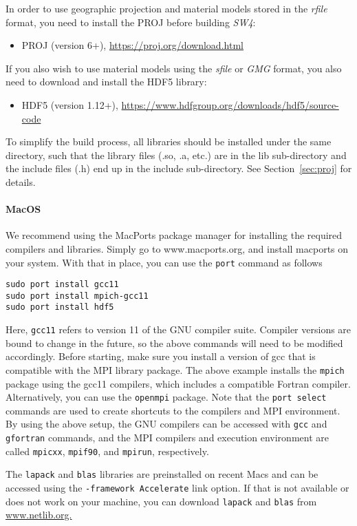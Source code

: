 \documentclass[11pt]{article}
\begin{document}
In order to use geographic projection and material models stored in the \emph{rfile} format, you need to install the PROJ before building \emph{SW4}:
\begin{itemize}
\item PROJ (version 6+), \url{https://proj.org/download.html}
\end{itemize}  
If you also wish to use material models using the \emph{sfile} or \emph{GMG} format, you also need to download and install the HDF5 library:
\begin{itemize}
\item HDF5 (version 1.12+), \url{https://www.hdfgroup.org/downloads/hdf5/source-code}
\end{itemize}
To simplify the build process, all libraries should be installed under the same directory, such that the library files (.so, .a, etc.) are in the lib sub-directory and the include files (.h) end up in the include sub-directory. See Section~\ref{sec:proj} for details.

\paragraph{MacOS}

We recommend using the MacPorts package manager for installing the required compilers and libraries. Simply go to www.macports.org, and install macports on your system. With that in place, you can use the \verb+port+ command as follows
\begin{verbatim}
sudo port install gcc11
sudo port install mpich-gcc11
sudo port install hdf5
\end{verbatim}
Here, \verb+gcc11+ refers to version 11 of the GNU compiler suite. Compiler versions are bound to change in the future, so the above commands will need to be modified accordingly. Before starting, make sure you install a version of gcc that is compatible with the MPI library package. The above example installs the \verb+mpich+ package using the gcc11 compilers, which includes a compatible Fortran compiler. Alternatively, you can use the \verb+openmpi+ package. Note that the \verb+port select+ commands are used to create shortcuts to the compilers and MPI environment. By using the above setup, the GNU compilers can be accessed with \verb+gcc+ and \verb+gfortran+ commands, and the MPI compilers and execution environment are called \verb+mpicxx+, \verb+mpif90+, and \verb+mpirun+, respectively.

The \verb+lapack+ and \verb+blas+ libraries are preinstalled on recent Macs and can be accessed using the \verb+-framework Accelerate+ link option. If that is not available or does not work on your machine, you can download \verb+lapack+ and \verb+blas+ from \url{www.netlib.org.}
\end{document}
